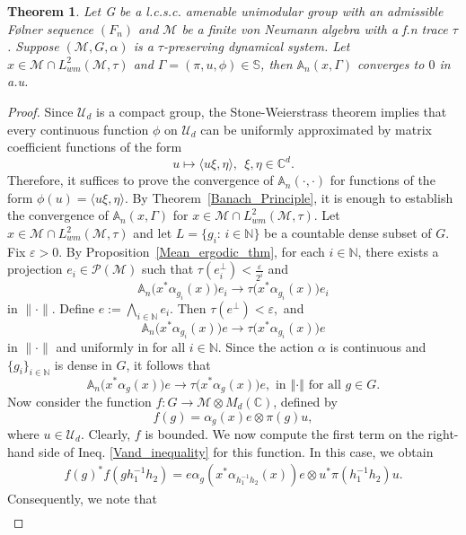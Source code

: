 \documentclass[11pt]{amsart}
\newtheorem{thm}{Theorem}[section]
\theoremstyle{definition}
\theoremstyle{myremark}
\numberwithin{equation}{section}
\def\A{\mathbb A}
\def\S{\mathbb S}
\newcommand{\CM}{\mathcal{M}}
\newcommand{\CP}{\mathcal{P}}
\newcommand{\norm}[1]{\left\Vert#1\right\Vert}
\begin{document}
\begin{thm}\label{main_theorem}
    Let G be a l.c.s.c. amenable unimodular group with an admissible F\o lner sequence $(F_n)$ and $ \CM$ be a finite von Neumann algebra with a f.n trace  $\tau$. Suppose $ (\CM, G, \alpha )$ is a $\tau$-preserving dynamical system. Let $x\in \CM \cap   L^2_{wm}(\CM,\tau)$ and $ \Gamma =( \pi, u, \phi) \in \S$, then $\A_n( x, \Gamma)$ converges  to $0$ in a.u.  
\end{thm}
   \begin{proof}

       Since $\mathcal{U}_d$ is a compact group, the Stone-Weierstrass theorem implies that every continuous function $\phi$ on $\mathcal{U}_d$ can be uniformly approximated by matrix coefficient functions of the form
       \[
u \mapsto \langle u\xi,\eta\rangle,
~~ \xi,\eta\in \mathbb{C}^d .
\]
Therefore, it suffices to prove the convergence of $\A_n(\cdot, \cdot)$ for functions of the form $\phi(u)=\langle u\xi,\eta\rangle .$
By Theorem~\ref{Banach_Principle}, it is enough to establish the convergence of $\A_n(x, \Gamma)$ for $ x\in \CM\cap L^2_{wm}(\CM,\tau).$
Let $x\in \CM\cap L^2_{wm}(\CM,\tau)$ and let $L=\{g_i:\, i\in\mathbb{N}\}$
be a countable dense subset of $G$. Fix $\varepsilon>0$. By Proposition~\ref{Mean_ergodic_thm}, for each $i\in\mathbb{N}$, there exists a projection $e_i\in \CP(\CM)$ such that $ \tau(e_i^\perp)<\frac{\varepsilon}{2^i}$
and
\[
\A_n\bigl(x^*\alpha_{g_i}(x)\bigr)e_i
\longrightarrow
\tau\bigl(x^*\alpha_{g_i}(x)\bigr)e_i
\]
in $\|\cdot\|$. 
Define $ e:=\bigwedge_{i\in\mathbb{N}} e_i .$
Then $ \tau(e^\perp)<\varepsilon,$
and
\[
\A_n\bigl(x^*\alpha_{g_i}(x)\bigr)e
\longrightarrow
\tau\bigl(x^*\alpha_{g_i}(x)\bigr)e
\]
in $\|\cdot\|$  and uniformly in for  all $i\in\mathbb{N}$.
Since the action $\alpha$ is continuous and $\{g_i\}_{i\in\mathbb{N}}$ is dense in $G$, it follows that
\[
\A_n\bigl(x^*\alpha_g(x)\bigr)e
\longrightarrow
\tau\bigl(x^*\alpha_g(x)\bigr)e, \text{ in } \norm{\cdot} \text{ for all } g \in G.
\]
Now consider the function $ f:G\to \CM\otimes M_d(\mathbb{C})$, 
defined by
\[
f(g)=\alpha_g(x)e\otimes \pi(g)u,
\]
where $u\in \mathcal{U}_d$. Clearly, $f$ is bounded.
We now compute the first term on the right-hand side of Ineq. \eqref{Vand_inequality} for this function. In this case, we obtain
      \begin{align*}
f(g)^*f(gh_1^{-1}h_2)=e\alpha_g(x^*\alpha_{h_1^{-1}h_2}(x))e\otimes u^*\pi({h_1^{-1}h_2 })u.
      \end{align*}
Consequently, we note that 
\begin{align}\label{inequality_A}

\end{align}
\end{proof}
\end{document}
